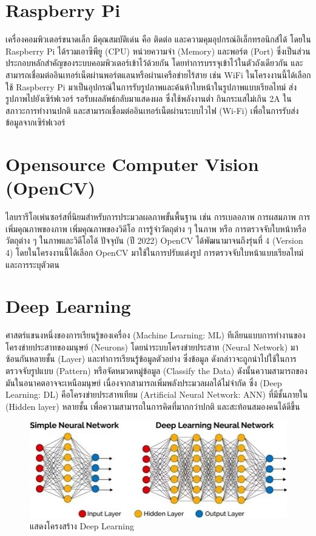 \section{Raspberry Pi}
เครื่องคอมพิวเตอร์ขนาดเล็ก มีคุณสมบัติเด่น คือ ติดต่อ และความคุมอุปกรณ์อิเล็กทรอนิกส์ได้ โดยใน Raspberry Pi 
ได้รวมเอาซีพียู (CPU) หน่วยความจำ (Memory) และพอร์ต (Port) ซึ่งเป็นส่วนประกอบหลักสำคัญของระบบคอมพิวเตอร์เข้าไว้ด้วยกัน 
โดยทำการบรรจุเข้าไว้ในตัวถังเดียวกัน และสามารถเชื่อมต่ออินเทอร์เน็ตผ่านพอร์ตแลนหรือผ่านเครือข่ายไร้สาย \cite{PI} เช่น WiFi
	ในโครงงานนี้ได้เลือกใช้ Raspberry Pi มาเป็นอุปกรณ์ในการรับรูปภาพและค้นห้าใบหน้าในรูปภาพแบบเรียลไทม์ ส่งรูปภาพไปยังเซิร์ฟเวอร์ 
รอรับผลลัพธ์กลับมาแสดงผล ซึ่งใช้พลังงานต่ำ กินกระแสไม่เกิน 2A ในสภาวะการทำงานปกติ และสามารถเชื่อมต่ออินเทอร์เน็ตผ่านระบบไวไฟ (Wi-Fi) 
เพื่อในการรับส่งข้อมูลจากเซิร์ฟเวอร์


\section{Opensource Computer Vision (OpenCV)}
ไลบรารีโอเพ่นซอร์สที่นิยมสำหรับการประมวลผลภาพขั้นพื้นฐาน เช่น การเบลอภาพ การผสมภาพ การเพิ่มคุณภาพของภาพ 
เพิ่มคุณภาพของวิดีโอ การรู้จำวัตถุต่าง ๆ ในภาพ หรือ การตรวจจับใบหน้าหรือวัตถุต่าง ๆ ในภาพและวิดีโอได้ 
ปัจจุบัน (ปี 2022) OpenCV ได้พัฒนามาจนถึงรุ่นที่ 4 (Version 4) โดยในโครงงานนี้ได้เลือก OpenCV มาใช้ในการปรับแต่งรูป 
การตรวจจับใบหน้าแบบเรียลไทม์ และการระบุตัวตน \cite{OpenCV}

\section{Deep Learning}
ศาสตร์แขนงหนึ่งของการเรียนรู้ของเครื่อง (Machine Learning: ML) ทีเลียนแบบการทำงานของโครงข่ายประสาทของมนุษย์ (Neurons) 
โดยนำระบบโครงข่ายประสาท (Neural Network) มาซ้อนกันหลายชั้น (Layer)
และทำการเรียนรู้ข้อมูลตัวอย่าง ซึ่งข้อมูล ดังกล่าวจะถูกนำไปใช้ในการตรวจจับรูปแบบ (Pattern) หรือจัดหมวดหมู่ข้อมูล (Classify the Data)
ดังนั้นความสามารถของมันในอนาคตอาจจะเหนือมนุษย์ เนื่องจากสามารถเพิ่มพลังประมวลผลได้ไม่จำกัด 
ซึ่ง (Deep Learning: DL) คือโครงข่ายประสาทเทียม (Artificial Neural Network: ANN) ที่มีชั้นภายใน (Hidden layer) หลายชั้น 
เพื่อความสามารถในการคิดที่มากกว่าปกติ และสะท้อนสมองคนได้ดีขึ้น \cite{DEEP}
\\

\begin{figure}[!ht]
  \begin{center}
    \includegraphics[scale=0.8]{pic/deep1.jpg}
    \caption[Poem]{แสดงโครงสร้าง Deep Learning}
    \label{fig:deep1}
  \end{center}
\end{figure}


